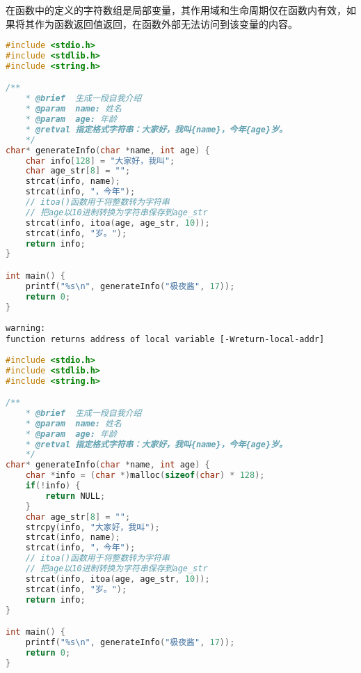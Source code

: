 在函数中的定义的字符数组是局部变量，其作用域和生命周期仅在函数内有效，如果将其作为函数返回值返回，在函数外部无法访问到该变量的内容。\\


\begin{lstlisting}[language=C]
#include <stdio.h>
#include <stdlib.h>
#include <string.h>

/**
    * @brief  生成一段自我介绍
    * @param  name: 姓名
    * @param  age: 年龄
    * @retval 指定格式字符串：大家好，我叫{name}，今年{age}岁。
    */
char* generateInfo(char *name, int age) {
    char info[128] = "大家好，我叫";
    char age_str[8] = "";
    strcat(info, name);
    strcat(info, "，今年");
    // itoa()函数用于将整数转为字符串
    // 把age以10进制转换为字符串保存到age_str
    strcat(info, itoa(age, age_str, 10));
    strcat(info, "岁。");
    return info;
}

int main() {
    printf("%s\n", generateInfo("极夜酱", 17));
    return 0;
}
\end{lstlisting}

\begin{tcolorbox}
	\begin{verbatim}
warning:
function returns address of local variable [-Wreturn-local-addr]
	\end{verbatim}
\end{tcolorbox}

\vspace{0.5cm}


\begin{lstlisting}[language=C]
#include <stdio.h>
#include <stdlib.h>
#include <string.h>

/**
    * @brief  生成一段自我介绍
    * @param  name: 姓名
    * @param  age: 年龄
    * @retval 指定格式字符串：大家好，我叫{name}，今年{age}岁。
    */
char* generateInfo(char *name, int age) {
    char *info = (char *)malloc(sizeof(char) * 128);
    if(!info) {
        return NULL;
    }
    char age_str[8] = "";
    strcpy(info, "大家好，我叫");
    strcat(info, name);
    strcat(info, "，今年");
    // itoa()函数用于将整数转为字符串
    // 把age以10进制转换为字符串保存到age_str
    strcat(info, itoa(age, age_str, 10));
    strcat(info, "岁。");
    return info;
}

int main() {
    printf("%s\n", generateInfo("极夜酱", 17));
    return 0;
}
\end{lstlisting}

